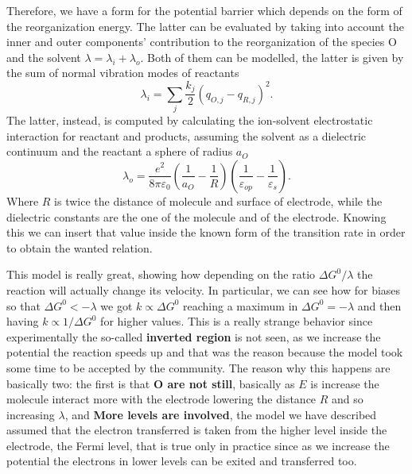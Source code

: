 {\begin{figure}[t]
{        }
    \end{figure}
    Therefore, we have a form for the potential barrier which depends on the form of the reorganization energy. The latter can be evaluated by taking into account the inner and outer components' contribution to the reorganization of the species O and the solvent $\lambda = \lambda_i + \lambda_o$. Both of them can be modelled, the latter is given by the sum of normal vibration modes of reactants
    \begin{equation}
        \lambda_i = \sum_j \frac{k_j}{2}(q_{O,j} - q_{R,j})^2.
    \end{equation}
    The latter, instead, is computed by calculating the ion-solvent electrostatic interaction for reactant and products, assuming the solvent as a dielectric continuum and the reactant a sphere of radius $a_O$
    \begin{equation}
        \lambda_o = \frac{e^2}{8\pi\varepsilon_0} \left( \frac{1}{a_O} - \frac{1}{R} \right)\left( \frac{1}{\varepsilon_{op}} - \frac{1}{\varepsilon_s} \right).
    \end{equation}
    Where $R$ is twice the distance of molecule and surface of electrode, while the dielectric constants are the one of the molecule and of the electrode. Knowing this we can insert that value inside the known form of the transition rate in order to obtain the wanted relation.
}
\noindent
This model is really great, showing how depending on the ratio $\Delta G^0/\lambda$ the reaction will actually change its velocity. In particular, we can see how for biases so that $\Delta G^0 < -\lambda$ we got $k \propto \Delta G^0$ reaching a maximum in $\Delta G^0 = -\lambda$ and then having $k \propto 1/\Delta G^0$ for higher values. This is a really strange behavior since experimentally the so-called \textbf{inverted region} is not seen, as we increase the potential the reaction speeds up and that was the reason because the model took some time to be accepted by the community. The reason why this happens are basically two: the first is that \textbf{O are not still}, basically as $E$ is increase the molecule interact more with the electrode lowering the distance $R$ and so increasing $\lambda$, and \textbf{More levels are involved}, the model we have described assumed that the electron transferred is taken from the higher level inside the electrode, the Fermi level, that is true only in practice since as we increase the potential the electrons in lower levels can be exited and transferred too. 

